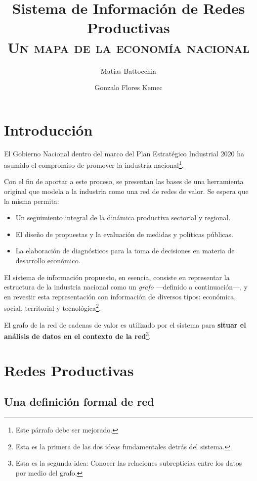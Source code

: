\documentclass[a4paper]{report}
\begin{document}
\title{Sistema de Información de Redes Productivas\\\textsc{Un mapa de la economía nacional}}
\author{Matías Battocchia}
\author{Gonzalo Flores Kemec}

\maketitle

\section*{Introducción}

El Gobierno Nacional dentro del marco del Plan Estratégico Industrial 2020 ha asumido el compromiso de promover la industria nacional\footnote{Este párrafo debe ser mejorado.}.

Con el fin de aportar a este proceso, se presentan las bases de una herramienta original que modela a la industria como una red de redes de valor. Se espera que la misma permita:

\begin{itemize}
  \item Un seguimiento integral de la dinámica productiva sectorial y regional.
  \item El diseño de propuestas y la evaluación de medidas y políticas públicas.
  \item La elaboración de diagnósticos para la toma de decisiones en materia de desarrollo económico.
\end{itemize}

El sistema de información propuesto, en esencia, consiste en representar la estructura de la industria nacional como un \textit{grafo} —definido a continuación—, y en revestir esta representación con información de diversos tipos: económica, social, territorial y tecnológica\footnote{Esta es la primera de las dos ideas fundamentales detrás del sistema.}.

El grafo de la red de cadenas de valor es utilizado por el sistema para \textbf{situar el análisis de datos en el contexto de la red}\footnote{Esta es la segunda idea: Conocer las relaciones subrepticias entre los datos por medio del grafo.}.

\section*{Redes Productivas}

\subsection*{Una definición formal de red}
\end{document}
